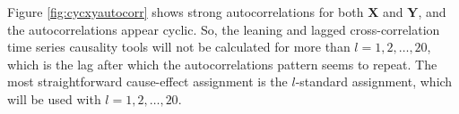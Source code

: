 
Figure \ref{fig:cycxyautocorr} shows strong autocorrelations for both $\mathbf{X}$ and $\mathbf{Y}$, and the autocorrelations appear cyclic.  So, the leaning and lagged cross-correlation time series causality tools will not be calculated for more than $l=1,2,\ldots,20$, which is the lag after which the autocorrelations pattern seems to repeat.  The most straightforward cause-effect assignment is the $l$-standard assignment, which will be used with $l = 1,2,\ldots,20$. 

